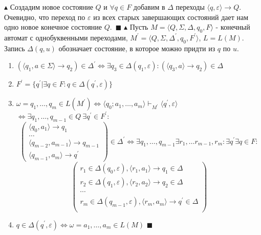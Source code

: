 \documentclass[11pt,a4paper]{report}
\theoremstyle{definition}
\theoremstyle{definition}
\theoremstyle{definition}
\begin{document}
$\blacktriangle$  Создадим новое состояние $Q$ и $\forall q \in F $ добавим в $\Delta$ переходы $\langle q, \varepsilon \rangle\rightarrow Q$. Очевидно, что переход по $\varepsilon$ из всех старых завершающих состояний дает нам одно новое конечное состояние $Q$.~$\blacksquare$
\newline
$\blacktriangle$ Пусть $M = \langle Q, \Sigma, \Delta, q_0, F\rangle$ - конечный автомат с однобуквенными переходами, $M^\prime = \langle Q, \Sigma, \Delta^\prime, q_0, F^\prime\rangle$,
$L = L(M)$. Запись $\Delta(q, u)$ обозначает состояние, в которое можно придти из $q$ по $u$.
\begin{enumerate}
\item{$
(\langle q_1, a \in \Sigma\rangle\rightarrow q_2) \in \Delta^\prime \Leftrightarrow\exists q_3 \in \Delta(q_1, \varepsilon) : (\langle q_3, a\rangle \rightarrow q_2) \in \Delta
$}
\item{$
F^\prime = \{q^\prime | \exists q \in F: q\in \Delta(q^\prime, \varepsilon)\}
$}
\item{$
\omega = q_1,\ldots, q_m \in L(M^\prime)\Leftrightarrow \langle q_0;a_1, \ldots, a_m\rangle\vdash_{M^\prime}\langle q^\prime, \varepsilon\rangle$
$
\Leftrightarrow \exists q_1,\ldots, q_{m-1}\in Q~ \exists q^\prime\in F^\prime: $
\[
\begin{pmatrix} 
\langle q_0, a_1\rangle\rightarrow q_1\\
\ldots\\
\langle q_{m-2}, a_{m-1}\rangle\rightarrow q_{m-1}\\
\langle q_{m-1}, a_m\rangle\rightarrow q^\prime
\end{pmatrix}\in \Delta^\prime \Leftrightarrow
\exists q_1, \ldots, q_{m-1} \exists r_1, \ldots r_{m-1}, r_m:
\exists q^\prime \exists q\in F:
\]
\[
\begin{pmatrix}
r_1\in \Delta(q_0, \varepsilon), \langle r_1, a_1\rangle\rightarrow q_1\in\Delta\\
r_2\in \Delta(q_1, \varepsilon), \langle r_2, a_2\rangle\rightarrow q_2\in\Delta\\
\cdots\\
r_m\in \Delta(q_{m-1}, \varepsilon), \langle r_m, a_m\rangle\rightarrow q^\prime\in\Delta\\
\end{pmatrix}
\]}
\item{$q\in\Delta(q^\prime, \varepsilon)\Leftrightarrow \omega=a_1,\ldots, a_m\in L(M)$ $\blacksquare$}
\end{enumerate}
\end{document}
